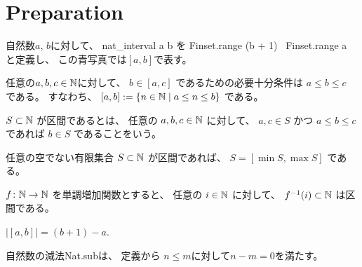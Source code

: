 \chapter{Preparation}

\begin{definition}
\label{df:nat_interval}
\leanok
自然数$a$, $b$に対して、
\textsf{nat\_interval a b}
を
\textsf{Finset.range (b + 1) \ Finset.range a}
と定義し、
この青写真では$[a,b]$で表す。
\end{definition}

\begin{lemma}
\label{lm:nat_interval_mem}
\leanok
任意の$a,b,c \in \mathbb{N}$に対して、
$
b \in [a, c]
$
であるための必要十分条件は
$
a \le b \le c
$
である。
すなわち、
$
[a, b] := \{n \in \mathbb{N} \mid a \le n \le b\}
$
である。
\end{lemma}

\begin{definition}
\label{df:IsInterval}
\leanok
$
S \subset \mathbb{N}
$
が区間であるとは、
任意の
$
a, b, c \in \mathbb{N}
$
に対して、
$
a, c \in S
$
かつ
$
a \le b \le c
$
であれば
$
b \in S
$
であることをいう。
\end{definition}

\begin{lemma}
\label{lm:nonempty_interval_range}
\leanok
任意の空でない有限集合
$
S \subset \mathbb{N}
$
が区間であれば、
$
S = [\min S, \max S]
$
である。
\end{lemma}

\begin{lemma}
\label{lm:preimage_of_monotone_isInterval}
\leanok
$
f \colon \mathbb{N} \to \mathbb{N}
$
を単調増加関数とすると、
任意の
$
i \in \mathbb{N}
$
に対して、
$
f^{-1}(i) \subset \mathbb{N}
$
は区間である。
\end{lemma}

\begin{lemma}
\label{lm:nat_interval_card}
\leanok
$
|[a,b]| = (b+1) - a
$.
\end{lemma}

\begin{remark}
自然数の減法\textsf{Nat.sub}は、
定義から
$n \le m$に対して$n-m=0$を満たす。
\end{remark}

\begin{lemma}
\label{lm:finite_of_bounded_of_Nat}
\leanok
{}
\end{lemma}

